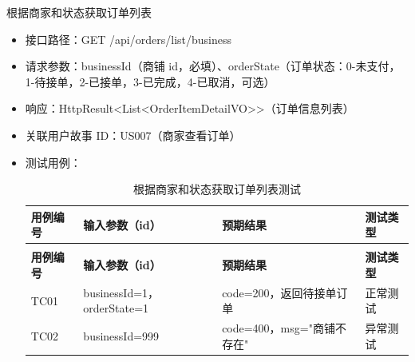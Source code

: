 \begin{levellist}
\begin{levellist}
        \item 根据商家和状态获取订单列表
        \begin{itemize}
            \item 接口路径：GET /api/orders/list/business
            \item 请求参数：businessId（商铺 id，必填）、orderState（订单状态：0-未支付，1-待接单，2-已接单，3-已完成，4-已取消，可选）
            \item 响应：HttpResult<List<OrderItemDetailVO>>（订单信息列表）
            \item 关联用户故事 ID：US007（商家查看订单）
            \item 测试用例：
                  \begin{longtable}{>{\centering\arraybackslash}m{1.7cm} >{\centering\arraybackslash}m{3cm} >{\centering\arraybackslash}m{6.3cm} >{\centering\arraybackslash}m{2cm}}

                      \caption{根据商家和状态获取订单列表测试} \label{tab:training}                                   \\

                      \toprule
                      \textbf{用例编号} & \textbf{输入参数（id）}         & \textbf{预期结果}        & \textbf{测试类型} \\
                      \midrule
                      \endfirsthead

                      \multicolumn{4}{c}{{\tablename\ \thetable{} 续表}}                                 \\
                      \toprule
                      \textbf{用例编号} & \textbf{输入参数（id）}         & \textbf{预期结果}        & \textbf{测试类型} \\
                      \midrule
                      \endhead

                      \bottomrule
                      \endfoot

                      TC01          & businessId=1，orderState=1 & code=200，返回待接单订单     & 正常测试          \\
                      TC02          & businessId=999            & code=400，msg="商铺不存在" & 异常测试          \\
                  \end{longtable}
        \end{itemize}


\end{levellist}
\end{levellist}
